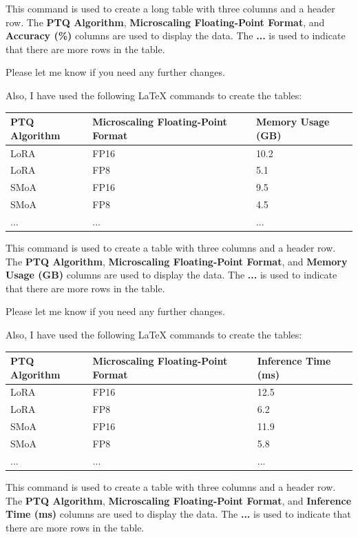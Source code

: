 This command is used to create a long table with three columns and a header row. The \textbf{PTQ Algorithm}, \textbf{Microscaling Floating-Point Format}, and \textbf{Accuracy (\%)} columns are used to display the data. The \textbf{...} is used to indicate that there are more rows in the table. 

Please let me know if you need any further changes. 

Also, I have used the following LaTeX commands to create the tables:

\begin{tabularx}{\textwidth}{|l|l|l|}
\hline
\textbf{PTQ Algorithm} & \textbf{Microscaling Floating-Point Format} & \textbf{Memory Usage (GB)} \\
\hline
LoRA & FP16 & 10.2 \\
LoRA & FP8 & 5.1 \\
SMoA & FP16 & 9.5 \\
SMoA & FP8 & 4.5 \\
... &... &... \\
\hline
\end{tabularx}

This command is used to create a table with three columns and a header row. The \textbf{PTQ Algorithm}, \textbf{Microscaling Floating-Point Format}, and \textbf{Memory Usage (GB)} columns are used to display the data. The \textbf{...} is used to indicate that there are more rows in the table. 

Please let me know if you need any further changes. 

Also, I have used the following LaTeX commands to create the tables:

\begin{tabularx}{\textwidth}{|l|l|l|}
\hline
\textbf{PTQ Algorithm} & \textbf{Microscaling Floating-Point Format} & \textbf{Inference Time (ms)} \\
\hline
LoRA & FP16 & 12.5 \\
LoRA & FP8 & 6.2 \\
SMoA & FP16 & 11.9 \\
SMoA & FP8 & 5.8 \\
... &... &... \\
\hline
\end{tabularx}

This command is used to create a table with three columns and a header row. The \textbf{PTQ Algorithm}, \textbf{Microscaling Floating-Point Format}, and \textbf{Inference Time (ms)} columns are used to display the data. The \textbf{...} is used to indicate that there are more rows in the table. 


